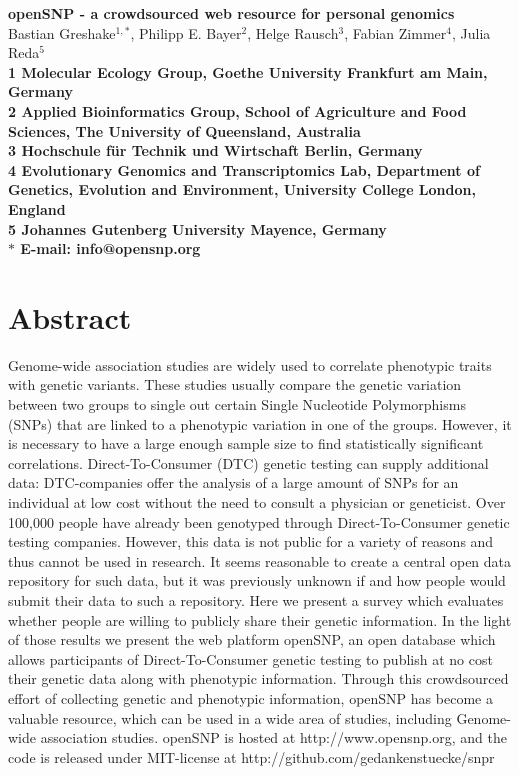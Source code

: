 \documentclass[10pt]{article}
\date{}
\begin{document}
\begin{flushleft}
{\Large
\textbf{openSNP - a crowdsourced web resource for personal genomics}
}
% 
\\
Bastian Greshake$^{1,\ast}$, 
Philipp E. Bayer$^{2}$, 
Helge Rausch$^{3}$,
Fabian Zimmer$^{4}$,
Julia Reda$^{5}$
\\
\bf{1} Molecular Ecology Group, Goethe University Frankfurt am Main, Germany
\\
\bf{2} Applied Bioinformatics Group, School of Agriculture and Food Sciences, The University of Queensland, Australia
\\
\bf{3} Hochschule f\"ur Technik und Wirtschaft Berlin, Germany 
\\
\bf{4} Evolutionary Genomics and Transcriptomics Lab, Department of Genetics, Evolution and Environment, University College London, England
\\
\bf{5} Johannes Gutenberg University Mayence, Germany
\\
$\ast$ E-mail: info@opensnp.org
\end{flushleft}

\section*{Abstract}
Genome-wide association studies are widely used to correlate phenotypic traits with genetic variants. These studies usually compare the genetic variation between two groups to single out certain Single Nucleotide Polymorphisms (SNPs) that are linked to a phenotypic variation in one of the groups. However, it is necessary to have a large enough sample size to find statistically significant correlations. Direct-To-Consumer (DTC) genetic testing can supply additional data: DTC-companies offer the analysis of a large amount of SNPs for an individual at low cost without the need to consult a physician or geneticist. Over 100,000 people have already been genotyped through Direct-To-Consumer genetic testing companies. However, this data is not public for a variety of reasons and thus cannot be used in research. It seems reasonable to create a central open data repository for such data, but it was previously unknown if and how people would submit their data to such a repository. Here we present a survey which evaluates whether people are willing to publicly share their genetic information. In the light of those results we present the web platform openSNP, an open database which allows participants of Direct-To-Consumer genetic testing to publish at no cost their genetic data along with phenotypic information. Through this crowdsourced effort of collecting genetic and phenotypic information, openSNP has become a valuable resource, which can be used in a wide area of studies, including Genome-wide association studies. openSNP is hosted at http://www.opensnp.org, and the code is released under MIT-license at http://github.com/gedankenstuecke/snpr
\end{document}
